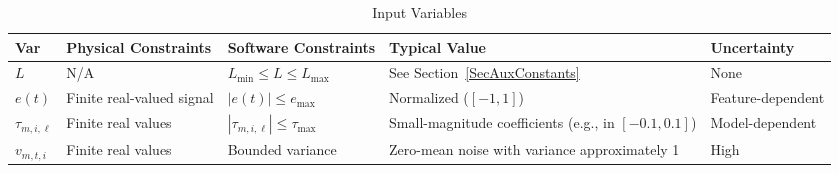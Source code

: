 \documentclass[12pt]{article}
\begin{document}
\begin{table}[!h]
  \caption{Input Variables} \label{TblInputVar}
  \renewcommand{\arraystretch}{1.3}
  \noindent
  \begin{tabular}{
      p{0.8cm}
      p{4.5cm}
      p{4.5cm}
      p{3cm}
      p{2cm}
    }
    \toprule
    \textbf{Var}
    & \textbf{Physical Constraints}
    & \textbf{Software Constraints}
    & \textbf{Typical Value}
    & \textbf{Uncertainty} \\
    \midrule

    $L$
    & N/A
    & $L_{\text{min}} \le L \le L_{\text{max}}$
    & See Section~\ref{SecAuxConstants}
    & None \\

    $e(t)$
    & Finite real-valued signal
    & $|e(t)| \le e_{\text{max}}$
    & Normalized ($[-1,1]$)
    & Feature-dependent \\

    $\tau_{m,i,\ell}$
    & Finite real values
    & $|\tau_{m,i,\ell}| \le \tau_{\text{max}}$
    & Small-magnitude coefficients (e.g., in $[-0.1,0.1]$)
    & Model-dependent \\

    $v_{m,t,i}$
    & Finite real values
    & Bounded variance
    & Zero-mean noise with variance approximately 1
    & High \\

    \bottomrule
  \end{tabular}
\end{table}

\end{document}

